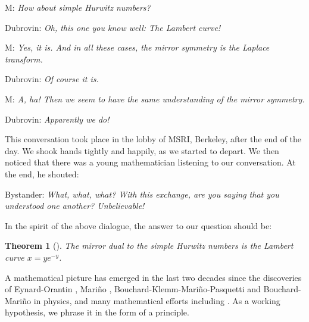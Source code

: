 \documentclass{amsart}
\newtheorem{thm}{Theorem}[section]
\theoremstyle{definition}
\numberwithin{equation}{section}
\numberwithin{figure}{section}
\begin{document}
\noindent
M: \textit{How about simple Hurwitz numbers?}

\noindent
Dubrovin: \textit{Oh, this one you know well: The Lambert 
curve!}

\noindent
M: \textit{Yes, it is. And in all these cases, the mirror
symmetry is the Laplace transform.}

\noindent
Dubrovin: \textit{Of course it is.}

\noindent
M: \textit{A, ha! Then we seem to have
the same understanding of the mirror symmetry.}

\noindent
Dubrovin: \textit{Apparently we do!}

\medskip

\noindent
This conversation took place in the lobby of MSRI, Berkeley, after the
end of the day. 
We shook hands tightly and happily, as we started to depart. 
We then noticed that there was a young mathematician listening to our conversation. 
At the end, he shouted: 
\medskip

\noindent
Bystander: \textit{What, what, what? With this exchange, are
you saying that you understood one  another? Unbelievable!}



\medskip

In the spirit of the above dialogue, the answer
to our  question should be:


\begin{thm}[\cite{BM, EMS, MZ}]
The mirror dual to the  simple Hurwitz numbers
is the Lambert curve
$x=y e^{-y}$.
\end{thm}


A  mathematical picture  has emerged in 
the last two decades since the discoveries
of Eynard-Orantin \cite{EO1},
Mari\~no \cite{Mar}, 
 Bouchard-Klemm-Mari\~no-Pasquetti
\cite{BKMP}
and Bouchard-Mari\~no \cite{BM} in physics, and 
 many mathematical efforts including
\cite{BHLM,CMS,  DMSS, DMNPS, EMS, FLZ,LM, MP2012,
MS2008, MS2015, MZ, N1,N3, N4,NS1,NS2,SW}. As a working hypothesis, we phrase it
in the form of a principle.
\end{document}
